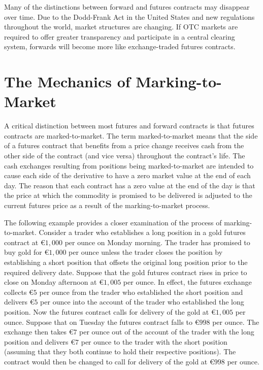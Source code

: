 \documentclass[11pt]{article}
\begin{document}
Many of the distinctions between forward and futures contracts may disappear over time. Due to the Dodd-Frank Act in the United States and new regulations throughout the world, market structures are changing. If OTC markets are required to offer greater transparency and participate in a central clearing system, forwards will become more like exchange-traded futures contracts.

\section*{The Mechanics of Marking-to-Market}
A critical distinction between most futures and forward contracts is that futures contracts are marked-to-market. The term marked-to-market means that the side of a futures contract that benefits from a price change receives cash from the other side of the contract (and vice versa) throughout the contract's life. The cash exchanges resulting from positions being marked-to-market are intended to cause each side of the derivative to have a zero market value at the end of each day. The reason that each contract has a zero value at the end of the day is that the price at which the commodity is promised to be delivered is adjusted to the current futures price as a result of the marking-to-market process.

The following example provides a closer examination of the process of marking-to-market. Consider a trader who establishes a long position in a gold futures contract at $€ 1,000$ per ounce on Monday morning. The trader has promised to buy gold for $€ 1,000$ per ounce unless the trader closes the position by establishing a short position that offsets the original long position prior to the required delivery date. Suppose that the gold futures contract rises in price to close on Monday afternoon at $€ 1,005$ per ounce. In effect, the futures exchange collects $€ 5$ per ounce from the trader who established the short position and delivers $€ 5$ per ounce into the account of the trader who established the long position. Now the futures contract calls for delivery of the gold at $€ 1,005$ per ounce. Suppose that on Tuesday the futures contract falls to $€ 998$ per ounce. The exchange then takes $€ 7$ per ounce out of the account of the trader with the long position and delivers $€ 7$ per ounce to the trader with the short position (assuming that they both continue to hold their respective positions). The contract would then be changed to call for delivery of the gold at $€ 998$ per ounce.
\end{document}
